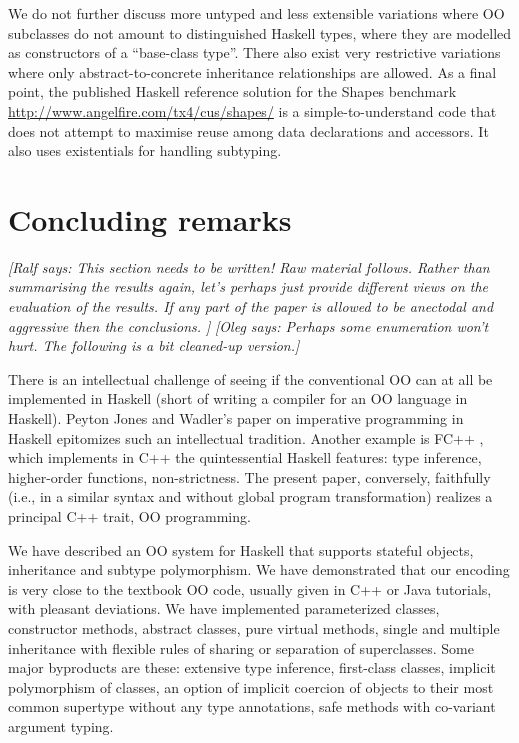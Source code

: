 \documentclass{jfp}
\newcommand{\oleg}[1]{{\it [Oleg says: #1]}}
\newcommand{\ralf}[1]{{\it [Ralf says: #1]}}
\begin{document}
We do not further discuss more untyped and less extensible variations
where OO subclasses do not amount to distinguished Haskell types,
where they are modelled as constructors of a ``base-class
type''. There also exist very restrictive variations where only
abstract-to-concrete inheritance relationships are allowed. As a final
point, the published Haskell reference solution for the Shapes
benchmark
\url{http://www.angelfire.com/tx4/cus/shapes/} is a simple-to-understand
code that does not attempt to maximise reuse among data declarations
and accessors. It also uses existentials for handling subtyping.





 
\section{Concluding remarks}
\label{S:concl}

\ralf{This section needs to be written! Raw material follows.
Rather than summarising the results again, let's perhaps just
provide different views on the evaluation of the results.
If any part of the paper is allowed to be anectodal and
aggressive then the conclusions.
}
\oleg{Perhaps some enumeration won't hurt. The following is a bit
  cleaned-up version.}


There is an intellectual challenge of seeing if the conventional OO
can at all be implemented in Haskell (short of writing a compiler for
an OO language in Haskell). Peyton Jones and Wadler's paper on
imperative programming in Haskell \cite{peytonjoneswadler-popl93}
epitomizes such an intellectual tradition. Another example is FC++
\cite{fcpp-jfp}, which implements in C++ the quintessential Haskell
features: type inference, higher-order functions, non-strictness. The
present paper, conversely, faithfully (i.e., in a similar syntax and
without global program transformation) realizes a principal C++ trait,
OO programming.


We have described an OO system for Haskell that supports stateful
objects, inheritance and subtype polymorphism. We have demonstrated
that our encoding is very close to the textbook OO code, usually given
in C++ or Java tutorials, with pleasant deviations.  We have
implemented parameterized classes, constructor methods, abstract
classes, pure virtual methods, single and multiple inheritance with
flexible rules of sharing or separation of superclasses. Some major
byproducts are these: extensive type inference, first-class classes,
implicit polymorphism of classes, an option of implicit coercion of
objects to their most common supertype without any type annotations,
safe methods with co-variant argument typing.
\end{document}
